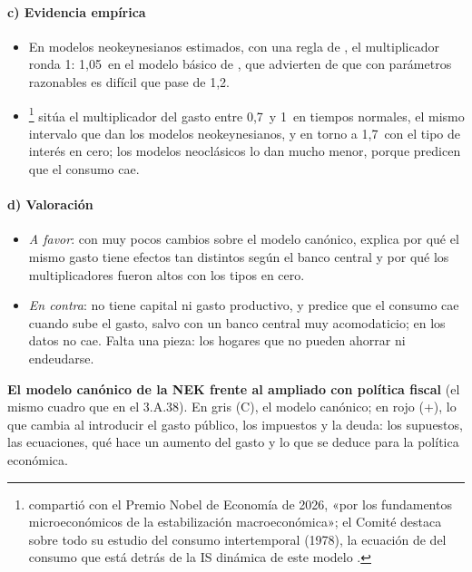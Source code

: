 \documentclass[11pt]{article}
\begin{document}
\paragraph{c) Evidencia empírica}

\begin{itemize}
\item En modelos neokeynesianos estimados, con una regla de , el multiplicador ronda 1: 1,05~en el modelo básico de \textcite{ChristianoEichenbaumRebelo2011}, que advierten de que con parámetros razonables es difícil que pase de 1,2.
\item \textcite{Hall2009By}\footnote{ compartió con  el Premio Nobel de Economía de 2026, «por los fundamentos microeconómicos de la estabilización macroeconómica»\nocite{Nobel2026Prensa}; el Comité destaca sobre todo su estudio del consumo intertemporal (1978), la ecuación de  del consumo que está detrás de la IS dinámica de este modelo \nocite{Nobel2026Cientifico}.} sitúa el multiplicador del gasto entre 0,7~y 1~en tiempos normales, el mismo intervalo que dan los modelos neokeynesianos, y en torno a 1,7~con el tipo de interés en cero; los modelos neoclásicos lo dan mucho menor, porque predicen que el consumo cae.
\end{itemize}

\paragraph{d) Valoración}

\begin{itemize}
\item \emph{A favor}: con muy pocos cambios sobre el modelo canónico, explica por qué el mismo gasto tiene efectos tan distintos según el banco central y por qué los multiplicadores fueron altos con los tipos en cero.
\item \emph{En contra}: no tiene capital ni gasto productivo, y predice que el consumo cae cuando sube el gasto, salvo con un banco central muy acomodaticio; en los datos no cae. Falta una pieza: los hogares que no pueden ahorrar ni endeudarse.
\end{itemize}

\begin{anotaciones}
\textbf{El modelo canónico de la NEK frente al ampliado con política fiscal} (el mismo cuadro que en el 3.A.38). En gris (\textsf{C}), el modelo canónico; en rojo (+), lo que cambia al introducir el gasto público, los impuestos y la deuda: los supuestos, las ecuaciones, qué hace un aumento del gasto y lo que se deduce para la política económica.
\begin{infografiacaja}
\caption{El modelo neokeynesiano canónico y el ampliado con política fiscal}\label{figu:nek-canonico-fiscal}
\end{infografiacaja}
\end{anotaciones}
\end{document}
